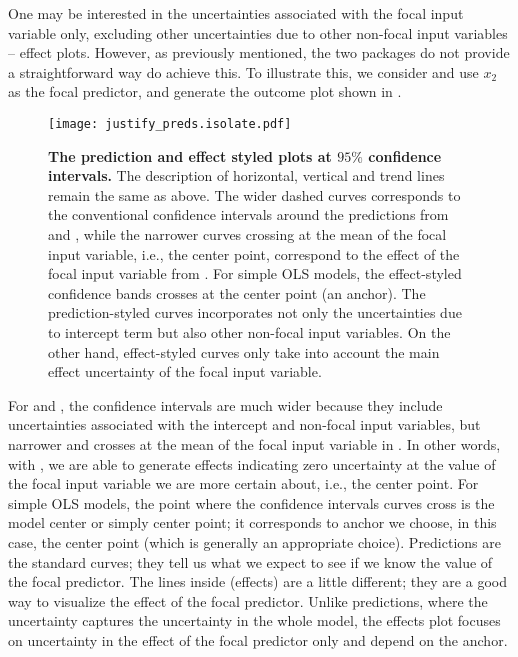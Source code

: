 One may be interested in the uncertainties associated with the focal input variable only, excluding other uncertainties due to other non-focal input variables -- effect plots. However, as previously mentioned, the two packages do not provide a straightforward way do achieve this. To illustrate this, we consider  and use $x_2$ as the focal predictor, and generate the outcome plot shown in . 
%
\begin{figure}
\begin{center}
\texttt{[image: justify\_preds.isolate.pdf]}
\end{center}
\caption{{\bf The prediction and effect styled plots at $95\%$ confidence intervals.} The description of horizontal, vertical and trend lines remain the same as above. The wider dashed curves corresponds to the conventional confidence intervals around the predictions from  and , while the narrower curves crossing at the mean of the focal input variable, i.e., the center point, correspond to the effect of the focal input variable from . For simple OLS models, the effect-styled confidence bands crosses at the center point (an anchor). The prediction-styled curves incorporates not only the uncertainties due to intercept term but also other non-focal input variables. On the other hand, effect-styled curves only take into account the main effect uncertainty of the focal input variable.}
\label{fig:justify_ci_plots}
\end{figure}
%
For  and , the confidence intervals are much wider because they include uncertainties associated with the intercept and non-focal input variables, but narrower and crosses at the mean of the focal input variable in . In other words, with , we are able to generate effects indicating zero uncertainty at the value of the focal input variable we are more certain about, i.e., the center point. For simple OLS models, the point where the confidence intervals curves cross is the model center or simply center point; it corresponds to anchor we choose, in this case, the center point (which is generally an appropriate choice). Predictions are the standard curves; they tell us what we expect to see if we know the value of the focal predictor. The lines inside (effects) are a little different; they are a good way to visualize the effect of the focal predictor. Unlike predictions, where the uncertainty captures the uncertainty in the whole model, the effects plot focuses on uncertainty in the effect of the focal predictor only and depend on the anchor.

